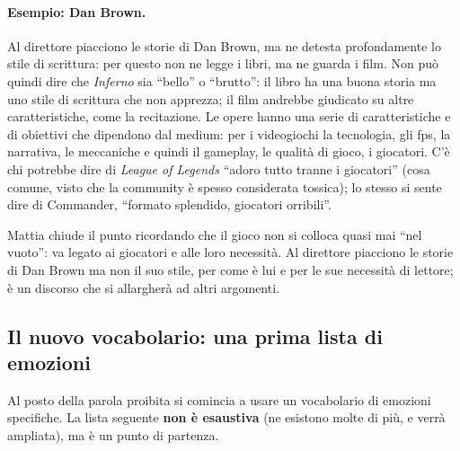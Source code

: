 \paragraph{Esempio: Dan Brown.} Al direttore piacciono le storie di Dan Brown,
ma ne detesta profondamente lo stile di scrittura: per questo non ne legge i
libri, ma ne guarda i film. Non può quindi dire che \emph{Inferno} sia
``bello'' o ``brutto'': il libro ha una buona storia ma uno stile di scrittura
che non apprezza; il film andrebbe giudicato su altre caratteristiche, come la
recitazione. Le opere hanno una serie di caratteristiche e di obiettivi che
dipendono dal medium: per i videogiochi la tecnologia, gli fps, la narrativa,
le meccaniche e quindi il gameplay, le qualità di gioco, i giocatori. C'è chi
potrebbe dire di \emph{League of Legends} ``adoro tutto tranne i giocatori''
(cosa comune, visto che la community è spesso considerata tossica); lo stesso
si sente dire di Commander, ``formato splendido, giocatori orribili''.

Mattia chiude il punto ricordando che il gioco non si colloca quasi mai ``nel
vuoto'': va legato ai giocatori e alle loro necessità. Al direttore piacciono
le storie di Dan Brown ma non il suo stile, per come è lui e per le sue
necessità di lettore; è un discorso che si allargherà ad altri argomenti.

\subsection{Il nuovo vocabolario: una prima lista di emozioni}



Al posto della parola proibita si comincia a usare un vocabolario di emozioni
specifiche. La lista seguente \textbf{non è esaustiva} (ne esistono molte di
più, e verrà ampliata), ma è un punto di partenza.

